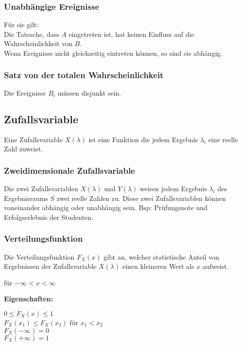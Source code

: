 \subsubsection{Unabhängige Ereignisse}
Für sie gilt: \\[5pt]
Die Tatsache, dass $A$ eingetreten ist, hat keinen Einfluss auf die Wahrscheinlichkeit von $B$.\\
Wenn Ereignisse nicht gleichzeitig eintreten können, so sind sie abhängig.

\subsubsection{Satz von der totalen Wahrscheinlichkeit}
 \qquad
Die Ereignisse $B_i$ müssen disjunkt sein.

\subsection{Zufallsvariable}
Eine Zufallsvariable $X(\lambda)$ ist eine Funktion die jedem Ergebnis $\lambda_i$ eine reelle Zahl zuweist.

\subsubsection{Zweidimensionale Zufallsvariable}
Die zwei Zufallsvariablen $X(\lambda)$ und $Y(\lambda)$ weisen jedem Ergebnis $\lambda_i$ des Ergebnisraums $S$ zwei reelle Zahlen zu. Diese zwei Zufallsvariablen können voneinander abhängig oder unabhängig sein.
Bsp: Prüfungsnote und Erfolgserlebnis der Studenten.

\subsubsection{Verteilungsfunktion}
Die Verteilungsfunktion $F_X(x)$ gibt an, welcher statistische Anteil von Ergebnissen der Zufallsvariable $X(\lambda)$ einen kleineren Wert als $x$ aufweist.
\begin{center}
	 \qquad für $-\infty < x < \infty$
\end{center}

\textbf{Eigenschaften:}
\begin{multicols}{2}
	$0 \le F_X(x) \le 1$\\
	$F_X(x_1) \le F_X(x_2)$ für $x_1 < x_2$
	\columnbreak\\
	$F_X(-\infty) = 0$\\
	$F_X(+\infty) = 1$
\end{multicols}

